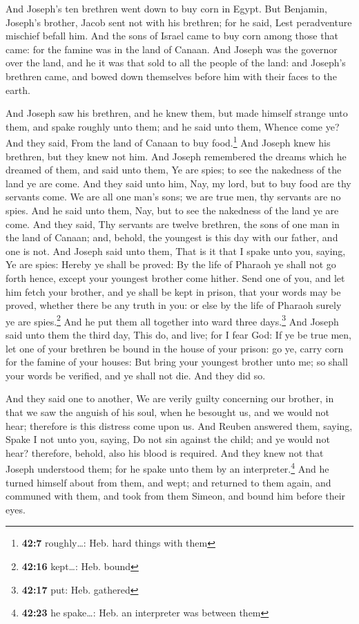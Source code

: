  And Joseph's ten brethren went down to buy corn in Egypt.
 But Benjamin, Joseph's brother, Jacob sent not with his
brethren; for he said, Lest peradventure mischief befall him.
 And the sons of Israel came to buy corn among those that
came: for the famine was in the land of Canaan.  And
Joseph was the governor over the land, and he it was that sold to all
the people of the land: and Joseph's brethren came, and bowed down
themselves before him with their faces to the earth.

 And Joseph saw his brethren, and he knew them, but made
himself strange unto them, and spake roughly unto them; and he said unto
them, Whence come ye? And they said, From the land of Canaan to buy
food.\footnote{\textbf{42:7} roughly\ldots: Heb. hard things with them}
 And Joseph knew his brethren, but they knew not him.
 And Joseph remembered the dreams which he dreamed of
them, and said unto them, Ye are spies; to see the nakedness of the land
ye are come.  And they said unto him, Nay, my lord, but
to buy food are thy servants come.  We are all one man's
sons; we are true men, thy servants are no spies.  And he
said unto them, Nay, but to see the nakedness of the land ye are come.
 And they said, Thy servants are twelve brethren, the
sons of one man in the land of Canaan; and, behold, the youngest is this
day with our father, and one is not.  And Joseph said
unto them, That is it that I spake unto you, saying, Ye are spies:
 Hereby ye shall be proved: By the life of Pharaoh ye
shall not go forth hence, except your youngest brother come hither.
 Send one of you, and let him fetch your brother, and ye
shall be kept in prison, that your words may be proved, whether there be
any truth in you: or else by the life of Pharaoh surely ye are
spies.\footnote{\textbf{42:16} kept\ldots: Heb. bound} 
And he put them all together into ward three days.\footnote{\textbf{42:17}
  put: Heb. gathered}  And Joseph said unto them the
third day, This do, and live; for I fear God:  If ye be
true men, let one of your brethren be bound in the house of your prison:
go ye, carry corn for the famine of your houses:  But
bring your youngest brother unto me; so shall your words be verified,
and ye shall not die. And they did so.

 And they said one to another, We are verily guilty
concerning our brother, in that we saw the anguish of his soul, when he
besought us, and we would not hear; therefore is this distress come upon
us.  And Reuben answered them, saying, Spake I not unto
you, saying, Do not sin against the child; and ye would not hear?
therefore, behold, also his blood is required.  And they
knew not that Joseph understood them; for he spake unto them by an
interpreter.\footnote{\textbf{42:23} he spake\ldots: Heb. an interpreter
  was between them}  And he turned himself about from
them, and wept; and returned to them again, and communed with them, and
took from them Simeon, and bound him before their eyes.

